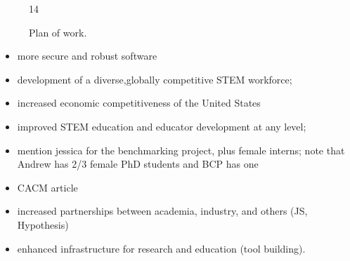\begin{figure}[ht]
  \centering
\begin{ganttchart}[
      expand chart=\textwidth,
      y unit chart=.4cm,
    ]{1}{4}
  
\end{ganttchart}
  \caption{Plan of work.  \iflater{}\fi
}\label{fig:workplan}
\end{figure}





\begin{itemize}
\item more secure and robust software
\item development of a diverse,globally competitive STEM workforce;
\item increased economic competitiveness of the United States
\item improved STEM education and educator development at any level;
\item mention jessica for the benchmarking project, plus female
interns; note that Andrew has 2/3 female PhD students and BCP has one
\item CACM article
\item increased partnerships between academia, industry, and others
(JS, Hypothesis)
\item enhanced infrastructure for research and education (tool
building).
\end{itemize}

